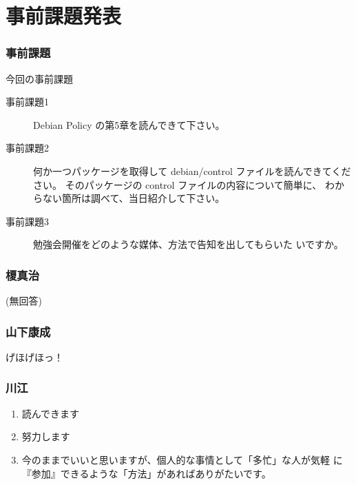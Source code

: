 \documentclass[cjk,dvipdfmx,12pt,%
hyperref={bookmarks=true,bookmarksnumbered=true,bookmarksopen=false,%
colorlinks=false,%
pdftitle={第 57 回 関西 Debian 勉強会},%
pdfauthor={倉敷・のがた・河田・佐々木},%
pdfsubject={資料},%
}]{beamer}
\begin{document}

\section{事前課題発表}


\begin{frame}[fragile]
\frametitle{事前課題}

\begin{block}{今回の事前課題}
  \begin{description}
  \item[事前課題1] Debian Policy の第5章を読んできて下さい。
  \item[事前課題2] 何か一つパッケージを取得して
    debian/control ファイルを読んできてください。
    そのパッケージの control ファイルの内容について簡単に、
    わからない箇所は調べて、当日紹介して下さい。
  \item[事前課題3] 勉強会開催をどのような媒体、方法で告知を出してもらいた
    いですか。
  \end{description}
\end{block}

\end{frame}


\begin{frame}[fragile]
\frametitle{ 榎真治 }
\begin{center}
  (無回答)
\end{center}
\end{frame}

\begin{frame}[fragile]
\frametitle{ 山下康成 }
\begin{center}
  げほげほっ！
\end{center}
\end{frame}

\begin{frame}[fragile]
\frametitle{ 川江 }
  \begin{enumerate}
  \item 読んできます
  \item 努力します
  \item 今のままでいいと思いますが、個人的な事情として「多忙」な人が気軽
    に『参加』できるような「方法」があればありがたいです。
  \end{enumerate}
\end{frame}
\end{document}
